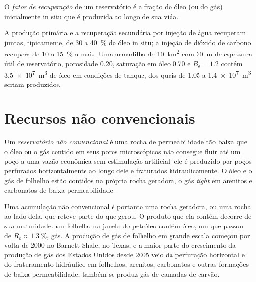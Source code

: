 \begin{definition}\label{def:b2:energy-geology:volumetrics}
O \emph{fator de recuperação} de um reservatório é a fração do óleo (ou do gás)
inicialmente in situ que é produzida ao longo de sua vida.
\end{definition}

A produção primária e a recuperação secundária por injeção de água recuperam juntas, tipicamente, de 30 a \qty{40}{\percent} do óleo in situ; a injeção de dióxido
de carbono recupera de 10 a \qty{15}{\percent} a mais. Uma armadilha de \qty{10}{km^2} com \qty{30}{m} de espessura útil
de reservatório, porosidade 0.20, saturação em óleo 0.70 e $B_o = 1.2$ contém \qty{3.5e7}{m^3} de óleo
em condições de tanque, dos quais de 1.05 a \qty{1.4e7}{m^3} seriam produzidos.

\section{Recursos não convencionais}\label{sec:b2:energy-geology:unconventional}

\begin{definition}\label{def:b2:energy-geology:unconventional}
Um \emph{reservatório não convencional} é uma rocha de permeabilidade tão
baixa que o óleo ou o gás contido em seus poros microscópicos não consegue fluir até um poço a uma vazão
econômica sem estimulação artificial; ele é produzido por poços perfurados horizontalmente ao longo dele e
fraturados hidraulicamente. O óleo e o gás de folhelho estão contidos na própria rocha geradora, o gás \textit{tight} em
arenitos e carbonatos de baixa permeabilidade.
\end{definition}

Uma acumulação não convencional é portanto uma rocha geradora, ou uma rocha ao lado dela, que reteve parte do que
gerou. O produto que ela contém decorre de sua maturidade: um folhelho na janela do petróleo contém óleo,
um que passou de $R_o \approx \qty{1.3}{\percent}$, gás. A produção de gás de folhelho em grande escala começou por volta de
2000 no Barnett Shale, no Texas, e a maior parte do crescimento da produção de gás dos Estados Unidos desde
2005 veio da perfuração horizontal e do fraturamento hidráulico em folhelhos, arenitos, carbonatos e
outras formações de baixa permeabilidade; também se produz gás de camadas de carvão.

